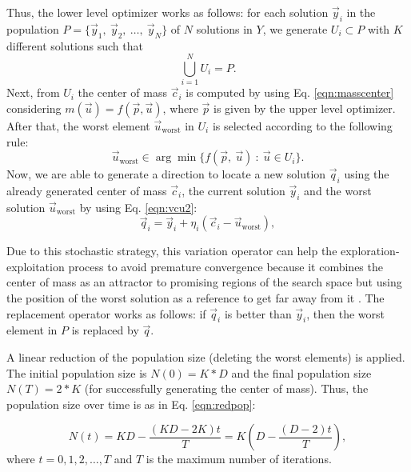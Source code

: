 \documentclass[conference]{IEEEtran}
\begin{document}
Thus, the lower level optimizer works as follows: for each solution $\vec{y}_i $
in the population $P = \{ \vec{y}_1,\ \vec{y}_2, \ \ldots, \ \vec{y}_{N} \} $
of $N$  solutions in $Y$, we generate $U_i \subset P $ with $K$ different
solutions such that
% 
$$
\bigcup_{i=1}^N U_i = P.
$$
%
Next, from $U_i$ the center of mass $\vec{c}_i$ is computed by using Eq. \ref{eqn:masscenter}
considering $m(\vec{u}) = f(\vec{p}, \vec{u})$, where $\vec{p}$ is given by the
upper level optimizer. After that, the worst element $\vec{u}_{\text{worst}}$
in $U_i$ is selected according to the following rule:
% 
$$
    \vec{u}_{\text{worst}} \in \arg \min \{f(\vec{p}, \ \vec{u} ) 
    \ : \
    \vec{u} \in U_i \}.
$$
% 
Now, we are able to generate a direction to locate a new solution $ \vec{q}_i$
using the already generated center of mass $\vec{c}_i$, the current solution
$\vec{y}_i$ and the worst solution $\vec{u}_{\text{worst}}$ by using Eq. \ref{eqn:vcu2}:
% 
\begin{equation}
    \vec{q}_i = \vec{y}_i + \eta _{i} ( \vec{c}_i - \vec{u}_{ \text{worst} } ) ,
    \label{eqn:vcu2}
\end{equation}
% 

Due to this stochastic strategy, this variation operator can help the exploration-exploitation 
process to avoid premature convergence because it combines the center of mass as
an attractor to promising regions of the search space but using the position of
the worst solution as a reference to get far away from it \cite{Mejia2018}. The
replacement operator works as follows: if $\vec{q}_i$ is better than $\vec{y}_i$,
then the worst element in $P$ is replaced by $\vec{q}$.


A linear reduction of the population size (deleting the worst elements) is applied.
The initial population size is $ N(0) = K*D$ and the final population size $N(T) =  2*K$
(for successfully generating the center of mass). Thus, the population size over
time is as in Eq. \ref{eqn:redpop}:

\begin{equation}
    N(t) = KD - \dfrac{(KD - 2K)  t}{T} 
    = K \left( D - \dfrac{(D - 2)  t}{T} \right),
\label{eqn:redpop}
\end{equation}
% 
where $t = 0,1,2,\ldots,T$ and $T$ is the maximum number of iterations.
\end{document}
